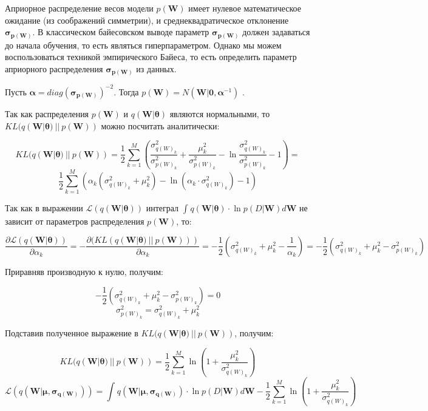 \documentclass{article}
\begin{document}
Априорное распределение весов модели $p(\pmb{W})$ имеет нулевое математическое ожидание (из соображений симметрии), и среднеквадратическое отклонение $\pmb{\sigma_{p(\pmb{W})}}$. В классическом байесовском выводе параметр $\pmb{\sigma_{p(\pmb{W})}}$ должен задаваться до начала обучения, то есть являться гиперпараметром. Однако мы можем воспользоваться техникой эмпирического Байеса, то есть определить параметр  априорного распределения $\pmb{\sigma_{p(\pmb{W})}}$ из данных.

Пусть $\pmb{\alpha} = diag(\pmb{\sigma_{p(\pmb{W})}})^{-2}$. Тогда
$
p(\pmb{W}) =
N(\pmb{W} | \pmb{0}, \pmb{\alpha}^{-1})$
.

Так как распределения $p(\pmb{W})$ и $q(\pmb{W} | \pmb{\theta})$ являются нормальными, то $KL(q(\pmb{W} | \pmb{\theta})~||~p(\pmb{W}))$ можно посчитать аналитически:

\[
KL(q(\pmb{W} | \pmb{\theta})~||~p(\pmb{W})) =
\dfrac{1}{2}\sum_{k=1}^{M}(\dfrac{\sigma_{{q(W)_{k}}}^2}{\sigma_{{p(W)_{k}}}^2} + \dfrac{\mu_{k}^2}{\sigma_{{p(W)_{k}}}^2} - \ln{\dfrac{\sigma_{{q(W)_{k}}}^2}{\sigma_{{p(W)_{k}}}^2}} - 1) =
\]\[
\dfrac{1}{2}\sum_{k=1}^{M}(\alpha_k (\sigma_{{q(W)_{k}}}^2 + \mu_{k}^2) - \ln{(\alpha_k \cdot \sigma_{{q(W)_{k}}}^2)} - 1)
\]

Так как в выражении
$\mathcal{L}(q(\pmb{W} | \pmb{\theta}))$
интеграл
$\int_{}{} q(\pmb{W} | \pmb{\theta}) \cdot \ln{p(D | \pmb{W})} d \pmb{W}$
не зависит от параметров распределения $p(\pmb{W})$, то:

\[
\dfrac{\partial \mathcal{L}(q(\pmb{W} | \pmb{\theta}))}{\partial {\alpha_k}} =
- \dfrac{\partial (KL(q(\pmb{W} | \pmb{\theta})~||~p(\pmb{W})))}{\partial {\alpha_k}} =
-\dfrac{1}{2}(\sigma_{{q(W)_{k}}}^2 + \mu_{k}^2 - \dfrac{1}{\alpha_k}) =
-\dfrac{1}{2}(\sigma_{{q(W)_{k}}}^2 + \mu_{k}^2 - \sigma_{{p(W)_{k}}}^2)
\]

Приравняв производную к нулю, получим:

\[
-\dfrac{1}{2}(\sigma_{{q(W)_{k}}}^2 + \mu_{k}^2 - \sigma_{{p(W)_{k}}}^2) = 0
\]
\[
\sigma_{{p(W)_{k}}}^2 = \sigma_{{q(W)_{k}}}^2 + \mu_{k}^2
\]

Подставив полученное выражение в $KL(q(\pmb{W} | \pmb{\theta})~||~p(\pmb{W}))$, получим:

\[
KL(q(\pmb{W} | \pmb{\theta})~||~p(\pmb{W})) =
\dfrac{1}{2}\sum_{k=1}^{M}\ln({1 + \dfrac{\mu_{k}^2}{\sigma_{{q(W)_{k}}}^2}})
\]
\[
\mathcal{L}(q(\pmb{W} | \pmb{\mu}, \pmb{\sigma_{q(\pmb{W})}})) =
\int_{}{} q(\pmb{W} | \pmb{\mu}, \pmb{\sigma_{q(\pmb{W})}}) \cdot \ln{p(D | \pmb{W})} d \pmb{W} - \dfrac{1}{2}\sum_{k=1}^{M}\ln({1 + \dfrac{\mu_{k}^2}{\sigma_{{q(W)_{k}}}^2}})
\]
\end{document}
